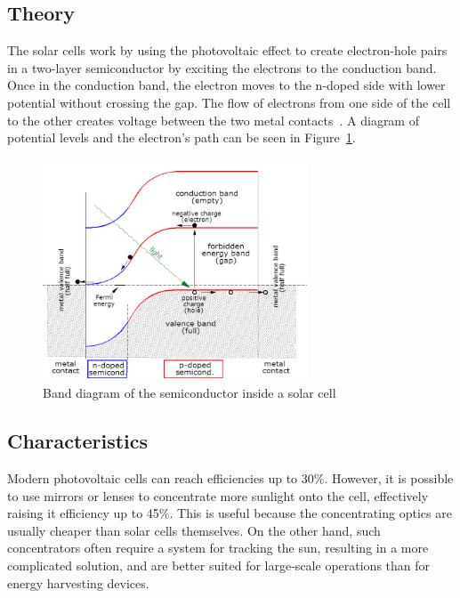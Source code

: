 \documentclass[a4paper,10pt]{article}
\begin{document}
\subsection{Theory}

The solar cells work by using the photovoltaic effect to create electron-hole pairs in a two-layer semiconductor by exciting the electrons to the conduction band. Once in the conduction band, the electron moves to the n-doped side with lower potential without crossing the gap. The flow of electrons from one side of the cell to the other creates voltage between the two metal contacts~\cite{wiki:solar-cells}. A diagram of potential levels and the electron's path can be seen in Figure~\ref{fig:pv-band-diagram}. 

\begin{figure}[!h]
\centering
\includegraphics[width=0.7\textwidth]{./Slike/PV-band-diagram}
 \caption{Band diagram of the semiconductor inside a solar cell~\cite{wiki:solar-cells}}
\label{fig:pv-band-diagram}
\end{figure}

\subsection{Characteristics}

Modern photovoltaic cells can reach efficiencies up to 30\%. However, it is possible to use mirrors or lenses to concentrate more sunlight onto the cell, effectively raising it efficiency up to 45\%. This is useful because the concentrating optics are usually cheaper than solar cells themselves. On the other hand, such concentrators often require a system for tracking the sun, resulting in a more complicated solution, and are better suited for large-scale operations than for energy harvesting devices. 
\end{document}

